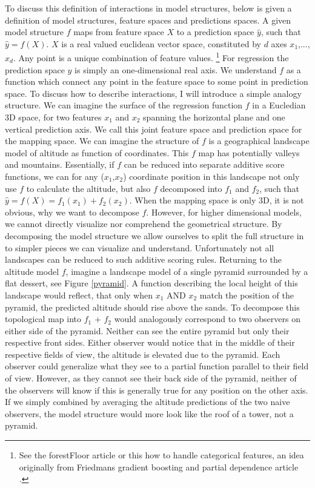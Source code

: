 To discuss this definition of interactions in model structures, below is given a definition of model structures, feature spaces and predictions spaces. A given model structure $f$ maps from feature space $X$ to a prediction space $\hat{y}$, such that $\hat{y} = f(X)$. $X$ is a real valued euclidean vector space, constituted by $d$ axes $x_1$,...,$x_d$. Any point is a unique combination of feature values.
\footnote{See the forestFloor article \cite{welling2016forest} or this how to handle categorical features, an idea originally from Friedmans gradient boosting and partial dependence article \cite{friedman2001greedy}.}
For regression the prediction space $\hat{y}$ is simply an one-dimensional real axis. We understand $f$ as a function which connect any point in the feature space to some point in prediction space. To discuss how to describe interactions, I will introduce a simple analogy structure. We can imagine the surface of the regression function $f$ in a Eucledian 3D space, for two features $x_1$ and $x_2$ spanning the horizontal plane and one vertical prediction axis. We call this joint feature space and prediction space for the mapping space. We can imagine the structure of $f$ is a geographical landscape model of altitude as function of coordinates. This $f$ map has potentially valleys and mountains. Essentially, if $f$ can be reduced into separate additive score functions, we can for any ($x_1$,$x_2$) coordinate position in this landscape not only use $f$ to calculate the altitude, but also $f$ decomposed into $f_1$ and $f_2$, such that $\hat{y} = f(X) = f_1(x_1) + f_2(x_2)$. When the mapping space is only 3D, it is not obvious, why we want to decompose $f$. However, for higher dimensional models, we cannot directly visualize nor comprehend the geometrical structure. By decomposing the model structure we allow ourselves to split the full structure in to simpler pieces we can visualize and understand. Unfortunately not all landscapes can be reduced to such additive scoring rules. Returning to the altitude model $f$, imagine a landscape model of a single pyramid surrounded by a flat dessert, see Figure \ref{pyramid}. A function describing the local height of this landscape would reflect, that only when $x_1$ AND $x_2$ match the position of the pyramid, the predicted altitude should rise above the sands. To decompose this topological map into $f_1$ + $f_2$ would analogously correspond to two observers on either side of the pyramid. Neither can see the entire pyramid but only their respective front sides. Either observer would notice that in the middle of their respective fields of view, the altitude is elevated due to the pyramid. Each observer could generalize what they see to a partial function parallel to their field of view. However, as they cannot see their back side of the pyramid, neither of the observers will know if this is generally true for any position on the other axis. If we simply combined by averaging the altitude predictions of the two naive observers, the model structure would more look like the roof of a tower, not a pyramid. 

